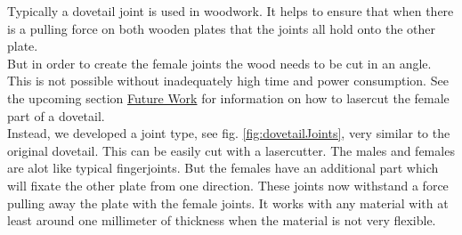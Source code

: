 \documentclass[../ClassicThesis.tex]{subfiles}
\begin{document}
    Typically a dovetail joint is used in woodwork. It helps to ensure that when there is a pulling force on both wooden plates that the joints all hold onto the other plate.\\
    But in order to create the female joints the wood needs to be cut in an angle. This is not possible without inadequately high time and power consumption. See the upcoming section \hyperref[futureWork]{Future Work} for information on how to lasercut the female part of a dovetail.\\
    Instead, we developed a joint type, see fig. \ref{fig:dovetailJoints}, very similar to the original dovetail. This can be easily cut with a lasercutter.
    The males and females are alot like typical fingerjoints. But the females have an additional part which will fixate the other plate from one direction.
    These joints now withstand a force pulling away the plate with the female joints. It works with any material with at least around one millimeter of thickness when the material is not very flexible.
\end{document}
